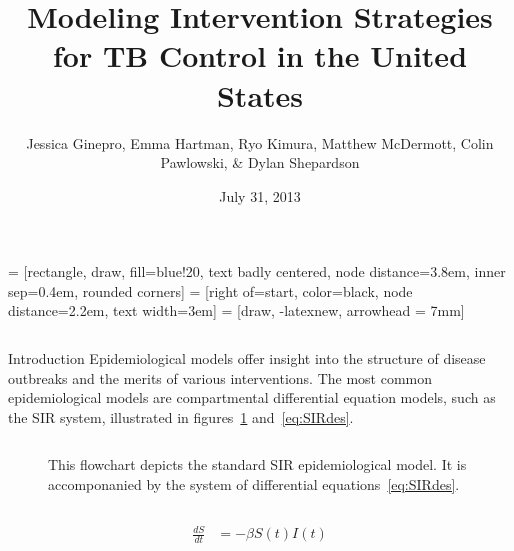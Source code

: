 \documentclass[final]{beamer}
\title{\huge Modeling Intervention Strategies for TB Control in the United States}
\author{Jessica Ginepro, Emma Hartman, Ryo Kimura, Matthew McDermott, Colin
        Pawlowski, \& Dylan Shepardson}
\institute[MHC]{Mathematical Modeling Group, Mount Holyoke College, South
                Hadley, MA, USA}
\date[July 31, 2013]{July 31, 2013}
\begin{document}
 = [rectangle, draw, fill=blue!20, text badly centered,
  node distance=3.8em, inner sep=0.4em, rounded corners]
 = [right of=start, color=black, node distance=2.2em,
text width=3em]
 = [draw, -latexnew, arrowhead = 7mm]


\begin{frame}
  \begin{columns}
    \begin{column}{.3\textwidth}
      \vspace{-20em}
      \begin{block}{Introduction}
        Epidemiological models offer insight into the structure of disease
        outbreaks and the merits of various interventions. The most common
        epidemiological models are compartmental differential equation models,
        such as the SIR system, illustrated in figures~\ref{fig:SIRFlowchart}
        and~\ref{eq:SIRdes}. 
        \begin{block}{}
          \begin{column}{.39\textwidth}
            \begin{figure}[h]
              \begin{center}
              \end{center}
              \caption{This flowchart depicts the standard SIR epidemiological
                       model. It is accomponanied by the system of differential
                       equations~\ref{eq:SIRdes}.}
              \label{fig:SIRFlowchart}
            \end{figure}
          \end{column}
          \begin{column}{.39\textwidth}
            \begin{figure}[h]
              \begin{align*}
                \frac{dS}{dt} &= -\beta S(t)I(t) \\

\end{align*}
\end{figure}
\end{column}
\end{block}
\end{block}
\end{column}
\end{columns}
\end{frame}
\end{document}
